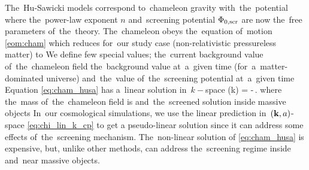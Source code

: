 The~Hu-Sawicki models correspond to~chameleon gravity with~the~potential
where the~power-law exponent $n$ and~screening potential $\Phi_{0,\text{\scriptsize scr}}$ are now the~free parameters of~the~theory.%
The~chameleon obeys the~equation of~motion \eqref{eom:cham} which reduces for~our study case (non-relativistic pressureless matter) to
We define few special values; the~current background value of~the~chameleon field
the~background value at~a~given time (for~a~matter-dominated universe)
and~the~value of~the~screening potential at~a~given time
Equation \eqref{eq:cham_husa} has a~linear solution in~$k-$space
\eq
{
\label{eq:chi_lin_k_cp}
	\hat{\chi}(k) = -\,.
}
where the~mass of~the~chameleon field is
and~the~screened solution inside massive objects
In~our cosmological simulations, we use the linear prediction in~$(\mathbf k, a)$-space \eqref{eq:chi_lin_k_cp} to get a pseudo-linear solution since it can address some effects of~the~screening mechanism. The~non-linear solution of \eqref{eq:cham_husa} is expensive, but, unlike other methods, can address the~screening regime inside and~near massive objects.

